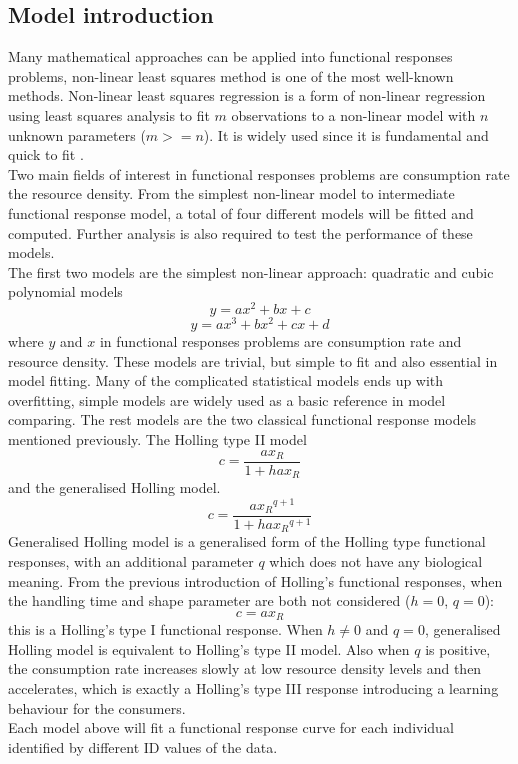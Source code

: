\documentclass{article}[11pt,a4,twosided,doublespacing,titlepagenumber=on,numbers=endperiod]
\begin{document}
\subsection{Model introduction}
Many mathematical approaches can be applied into functional responses problems, non-linear least squares method is one of the most well-known methods. Non-linear least squares regression is a form of non-linear regression using least squares analysis to fit $m$ observations to a non-linear model with $n$ unknown parameters ($m >= n$). It is widely used since it is fundamental and quick to fit \cite{cadet2006quantitative}.\\
\noindent
Two main fields of interest in functional responses problems are consumption rate the resource density. From the simplest non-linear model to intermediate functional response model, a total of four different models will be fitted and computed. Further analysis is also required to test the performance of these models. \\
\noindent
The first two models are the simplest non-linear approach: quadratic and cubic polynomial models
\begin{equation}
    y = a x^2 + b x + c
\end{equation}
\begin{equation}
    y = a x^3 + b x^2 + c x + d
\end{equation}
where $y$ and $x$ in functional responses problems are consumption rate and resource density. These models are trivial, but simple to fit and also essential in model fitting. Many of the complicated statistical models ends up with overfitting, simple models are widely used as a basic reference in model comparing.
The rest models are the two classical functional response models mentioned previously. The Holling type II model
\begin{equation}
    c = \frac{a x_R}{1+ h a x_R}
\end{equation}
and the generalised Holling model.
\begin{equation}
    c = \frac{a {x_R}^{q+1}}{1 + h a {x_R}^{q+1}}
\end{equation}
Generalised Holling model is a generalised form of the Holling type functional responses, with an additional parameter $q$ which does not have any biological meaning. From the previous introduction of Holling's functional responses, when the handling time and shape parameter are both not considered ($h = 0$, $q = 0$):
\begin{equation}
    c = a x_R
\end{equation}
this is a Holling's type I functional response. When $h \neq 0$ and $q = 0$, generalised Holling model is equivalent to Holling's type II model. Also when $q$ is positive, the consumption rate increases slowly at low resource density levels and then accelerates, which is exactly a Holling's type III response introducing a learning behaviour for the consumers. \\
\noindent Each model above will fit a functional response curve for each individual identified by different ID values of the data. 
\end{document}
